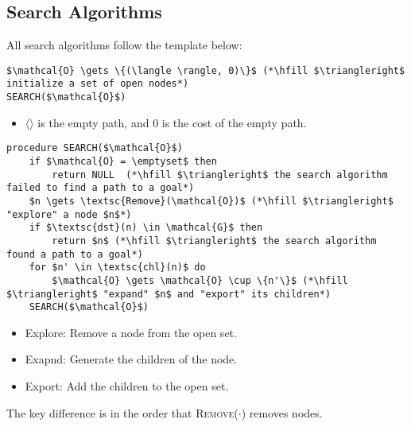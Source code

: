 \subsection{Search Algorithms}
\begin{definition}
    All search algorithms follow the template below:

\begin{lstlisting}
$\mathcal{O} \gets \{(\langle \rangle, 0)\}$ (*\hfill $\triangleright$ initialize a set of open nodes*) 
SEARCH($\mathcal{O}$)
\end{lstlisting}
\begin{itemize}
    \item $\langle \rangle$ is the empty path, and $0$ is the cost of the empty path.
\end{itemize}

\begin{lstlisting}
procedure SEARCH($\mathcal{O}$)
    if $\mathcal{O} = \emptyset$ then
        return NULL  (*\hfill $\triangleright$ the search algorithm failed to find a path to a goal*)
    $n \gets \textsc{Remove}(\mathcal{O})$ (*\hfill $\triangleright$ "explore" a node $n$*)
    if $\textsc{dst}(n) \in \mathcal{G}$ then
        return $n$ (*\hfill $\triangleright$ the search algorithm found a path to a goal*)
    for $n' \in \textsc{chl}(n)$ do
        $\mathcal{O} \gets \mathcal{O} \cup \{n'\}$ (*\hfill $\triangleright$ "expand" $n$ and "export" its children*)
    SEARCH($\mathcal{O}$)
\end{lstlisting}
\begin{itemize}
    \item Explore: Remove a node from the open set.
    \item Exapnd: Generate the children of the node.
    \item Export: Add the children to the open set.
\end{itemize}

\end{definition}

\begin{warning}
    The key difference is in the order that \textsc{Remove}($\cdot$) removes nodes.
\end{warning}

